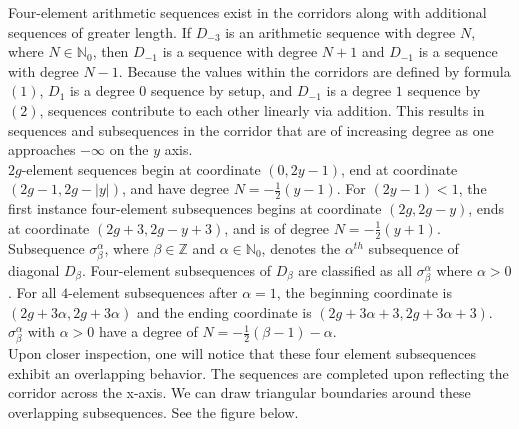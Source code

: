 \documentclass{article}
\newcommand\tab[1][1cm]{\hspace*{#1}}
\newcommand*{\set}[1]{\mathbb{#1}}
\theoremstyle{definition}
\begin{document}
  \tab Four-element arithmetic sequences exist in the corridors along with additional sequences of greater length. If $D_{-3}$ is an 
  arithmetic sequence with degree $N$, where $N \in \set{N}_0$, then
  $D_{-1}$ is a sequence with degree $N+1$ and $D_{-1}$ is a sequence with degree $N-1$. Because the values within the corridors are defined by formula $(1)$, 
  $D_{1}$ is a degree $0$ sequence by setup, and $D_{-1}$ is a degree $1$ sequence by $(2)$,
  sequences contribute to each other linearly via addition. This results in sequences and subsequences in the corridor that are of increasing degree 
  as one approaches $-\infty$ on the $y$ axis.\\
  \tab $2g$-element sequences begin at coordinate $(0,2y-1)$, end at coordinate $(2g-1, 2g-|y|)$, and have degree $N = -\frac{1}{2}(y - 1)$. 
  For $(2y-1) < 1$, the first instance four-element subsequences begins at coordinate $(2g, 2g-y)$, ends at coordinate $(2g + 3, 2g-y + 3)$, and is of degree
  $N = -\frac{1}{2}(y + 1)$.\\
  \tab Subsequence $\sigma_{\beta}^{\alpha}$, where ${\beta \in \set{Z}}$ and ${\alpha \in \set{N}_0}$, denotes the $\alpha^{th}$ 
  subsequence of diagonal $D_{\beta}$. Four-element subsequences of $D_{\beta}$ are classified as all $\sigma_{\beta}^{\alpha}$ where 
  $\alpha > 0$. For all $4$-element subsequences after $\alpha = 1$, the beginning coordinate is $(2g + 3\alpha, 2g+3\alpha)$ and 
  the ending coordinate is $(2g + 3\alpha+3, 2g+3\alpha+3)$. 
  $\sigma_{\beta}^{\alpha}$ with $\alpha > 0$ have a degree of $N = -\frac{1}{2}(\beta - 1) - \alpha$.\\
  \tab Upon closer inspection, one will notice that these four element subsequences exhibit an overlapping behavior. The sequences are completed upon
  reflecting the corridor across the x-axis. We can draw triangular boundaries around these overlapping subsequences. See the figure below.
\end{document}
